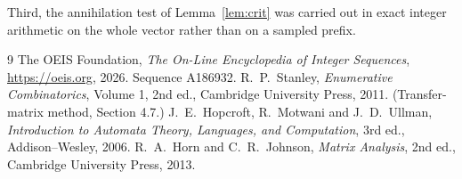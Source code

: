 \documentclass[11pt,a4paper]{article}
\theoremstyle{plain}
\theoremstyle{definition}
\begin{document}
Third, the annihilation test of Lemma~\ref{lem:crit} was carried out in exact integer
arithmetic on the whole vector rather than on a sampled prefix.

\begin{thebibliography}{9}
 The OEIS Foundation, \emph{The On-Line Encyclopedia of Integer
Sequences}, \url{https://oeis.org}, 2026. Sequence A186932.
 R.~P.~Stanley, \emph{Enumerative Combinatorics}, Volume 1, 2nd ed.,
Cambridge University Press, 2011. (Transfer-matrix method, Section 4.7.)
 J.~E.~Hopcroft, R.~Motwani and J.~D.~Ullman, \emph{Introduction to Automata
Theory, Languages, and Computation}, 3rd ed., Addison--Wesley, 2006.
 R.~A.~Horn and C.~R.~Johnson, \emph{Matrix Analysis}, 2nd ed., Cambridge
University Press, 2013.
\end{thebibliography}
\end{document}

